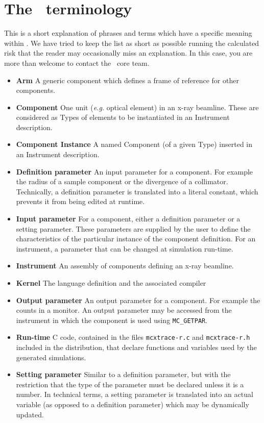 
\chapter{The \MCX\ terminology}
\label{s:terminology}

This is a short explanation of phrases and terms which have a specific
meaning within \MCX. We have tried to keep the list as short
as possible running the calculated risk that the reader may occasionally miss
an explanation. In this case, you are more than welcome to contact
the \MCX\ core team.

\noindent
\begin{itemize}
\item{\bfseries Arm}  A generic \MCX component which defines a frame of reference
      for other components.
\item{\bfseries Component} One unit ({\em e.g.} optical element) in an x-ray beamline. These are considered as Types of elements to be instantiated in an Instrument description.
\item{\bfseries Component Instance} A named Component (of a given Type) inserted in an Instrument description.
\item{\bfseries Definition parameter} An input parameter for a component. For
  example the radius of a sample component or the divergence of a collimator. Technically, a definition parameter 
  is translated into a literal constant, which prevents it from being edited at runtime. 
\item{\bfseries Input parameter} For a component, either a definition parameter
or a setting parameter. These parameters are supplied by the user to
define the characteristics of the particular instance of the component
definition. For an instrument, a parameter that can be changed at
simulation run-time.
\item{\bfseries Instrument} An assembly of \MCX components defining
      an x-ray beamline.
\item{\bfseries Kernel} The \MCX language definition and the associated compiler
\item{\bfseries Output parameter} An output parameter for a component.
  For example the counts in a monitor. An output parameter may be
  accessed from the instrument in which the component is used using
  \verb`MC_GETPAR`.
\item{\bfseries Run-time} C code, contained in the files
  \verb+mcxtrace-r.c+ and \verb+mcxtrace-r.h+ included in the \MCX
  distribution, that declare functions and variables used by the
  generated simulations.
\item{\bfseries Setting parameter} Similar to a definition parameter, but with the
  restriction that the type of the parameter must be declared unless it is a number. In technical terms, 
  a setting parameter is translated into an actual variable (as opposed to a definition parameter) which 
  may be dynamically updated.
\end{itemize}
